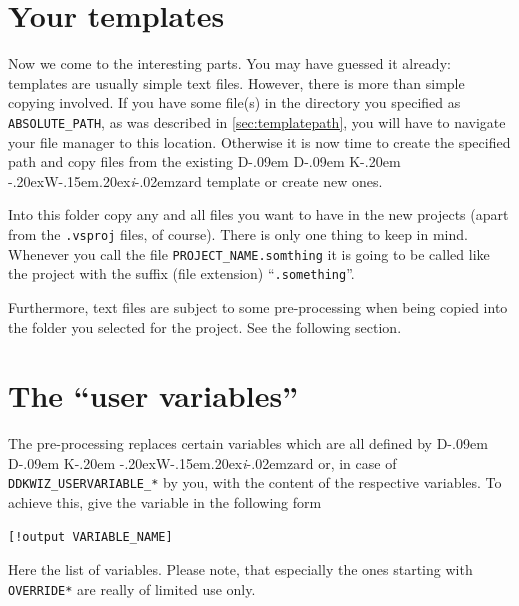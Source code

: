\documentclass[a4paper,titlepage]{report}
\def\ddkwiz{D\kern-.09em D\kern-.09em K\kern-.20em \raise-.20ex\hbox{W}\kern-.15em\raise.20ex\hbox{\it{i}}\kern-.02em{zard}}
\begin{document}
\section{Your templates}
Now we come to the interesting parts. You may have guessed it already: templates
are usually simple text files. However, there is more than simple copying involved.
If you have some file(s) in the directory you specified as \verb+ABSOLUTE_PATH+,
as was described in \autoref{sec:templatepath}, you will have to navigate your
file manager to this location. Otherwise it is now time to create the specified
path and copy files from the existing \ddkwiz{} template or create new ones.

Into this folder copy any and all files you want to have in the new projects (apart
from the \texttt{.vsproj} files, of course). There is only one thing to keep in
mind. Whenever you call the file \verb+PROJECT_NAME.somthing+ it is going to be
called like the project with the suffix (file extension) ``\texttt{.something}''.

Furthermore, text files are subject to some pre-processing when being copied
into the folder you selected for the project. See the following section.

\section{The ``user variables''}
The pre-processing replaces certain variables which are all defined by \ddkwiz{}
or, in case of \verb+DDKWIZ_USERVARIABLE_*+ by you, with the content of the
respective variables. To achieve this, give the variable in the following form

\begin{verbatim}
[!output VARIABLE_NAME]
\end{verbatim}

Here the list of variables. Please note, that especially the ones starting with
\verb+OVERRIDE*+ are really of limited use only.
\end{document}
